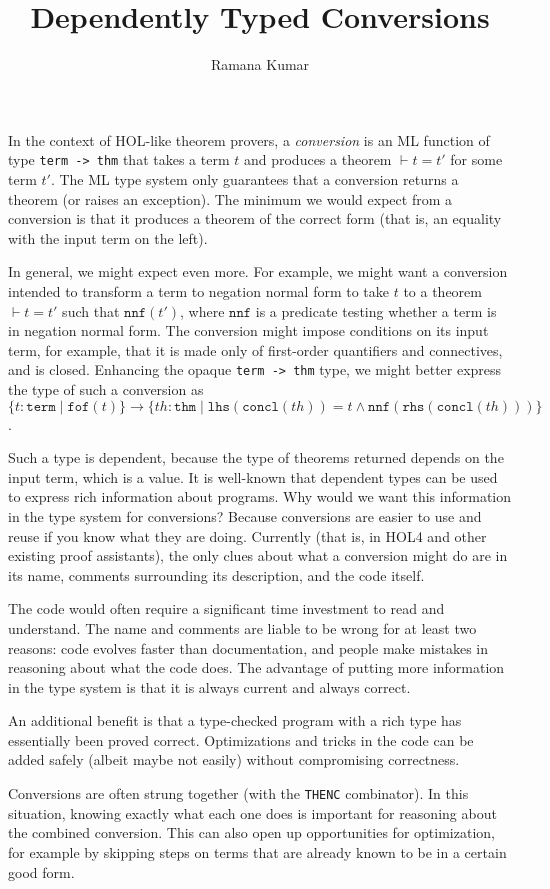 \documentclass{article}
\begin{document}
\title{Dependently Typed Conversions}
\author{Ramana Kumar}
\maketitle
In the context of HOL-like theorem provers, a \emph{conversion} is an ML function of type \texttt{term -> thm} that takes a term $t$ and produces a theorem $\vdash t = t'$ for some term $t'$.
The ML type system only guarantees that a conversion returns a theorem (or raises an exception).
The minimum we would expect from a conversion is that it produces a theorem of the correct form (that is, an equality with the input term on the left).

In general, we might expect even more.
For example, we might want a conversion intended to transform a term to negation normal form to take $t$ to a theorem $\vdash t = t'$ such that $\mathtt{nnf}(t')$, where $\mathtt{nnf}$ is a predicate testing whether a term is in negation normal form.
The conversion might impose conditions on its input term, for example, that it is made only of first-order quantifiers and connectives, and is closed. 
Enhancing the opaque \texttt{term -> thm} type, we might better express the type of such a conversion as $\{t:\mathtt{term}\mid\mathtt{fof}(t)\}\to\{th:\mathtt{thm}\mid\mathtt{lhs}(\mathtt{concl}(th))=t\land\mathtt{nnf}(\mathtt{rhs}(\mathtt{concl}(th)))\}$.

Such a type is dependent, because the type of theorems returned depends on the input term, which is a value.
It is well-known that dependent types can be used to express rich information about programs.
Why would we want this information in the type system for conversions?
Because conversions are easier to use and reuse if you know what they are doing.
Currently (that is, in HOL4 and other existing proof assistants), the only clues about what a conversion might do are in its name, comments surrounding its description, and the code itself.

The code would often require a significant time investment to read and understand.
The name and comments are liable to be wrong for at least two reasons: code evolves faster than documentation, and people make mistakes in reasoning about what the code does.
The advantage of putting more information in the type system is that it is always current and always correct.

An additional benefit is that a type-checked program with a rich type has essentially been proved correct.
Optimizations and tricks in the code can be added safely (albeit maybe not easily) without compromising correctness.

Conversions are often strung together (with the \texttt{THENC} combinator).
In this situation, knowing exactly what each one does is important for reasoning about the combined conversion.
This can also open up opportunities for optimization, for example by skipping steps on terms that are already known to be in a certain good form.
\end{document}
